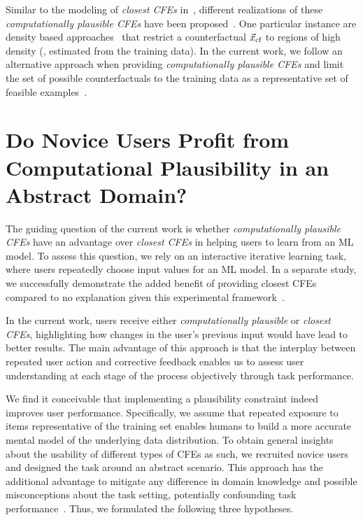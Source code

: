 Similar to the modeling of \textit{closest \glspl{CFE}} in~, different realizations of these \textit{computationally plausible \glspl{CFE}} have been proposed~\citep{looveren_interpretable_2019,poyiadzi_face_2019,artelt_convex_2020}. One particular instance are density based approaches~\citep{artelt_convex_2020} that restrict a counterfactual ${\vec{x}_{\text{cf}}}$ to regions of high density (\eg, estimated from the training data).
In the current work, we follow an alternative approach when providing \textit{computationally plausible \glspl{CFE}} and limit the set of possible counterfactuals to the training data as a representative set of feasible examples~\citep{poyiadzi_face_2019}.

\section{Do Novice Users Profit from Computational Plausibility in an Abstract Domain?}\label{sec:hypotheses}

The guiding question of the current work is whether \textit{computationally plausible \glspl{CFE}} have an advantage over \textit{closest \glspl{CFE}} in helping users to learn from an \gls{ML} model.
To assess this question, we rely on an interactive iterative learning task, where users repeatedly choose input values for an \gls{ML} model.
In a separate study, we successfully demonstrate the added benefit of providing closest \glspl{CFE} compared to no explanation given this experimental framework~\citep{IAZ ARXIV}.

In the current work, users receive either \textit{computationally plausible} or \textit{closest \glspl{CFE}}, highlighting how changes in the user's previous input would have lead to better results.
The main advantage of this approach is that the interplay between repeated user action and corrective feedback enables us to assess user understanding at each stage of the process objectively through task performance.

We find it conceivable that implementing a plausibility constraint indeed improves user performance. 
Specifically, we assume that repeated exposure to items representative of the training set enables humans to build a more accurate mental model of the underlying data distribution.
To obtain general insights about the usability of different types of \glspl{CFE} as such, we recruited novice users and designed the task around an abstract scenario.
This approach has the additional advantage to mitigate any difference in domain knowledge and possible misconceptions about the task setting, potentially confounding task performance~\citep{van_der_waa_evaluating_2021}.
Thus, we formulated the following three hypotheses.

